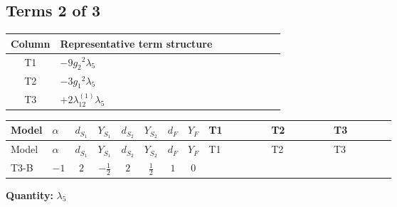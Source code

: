 \documentclass[8pt]{article}
\begin{document}
\begin{landscape}
\subsection*{Terms 2 of 3}
\begin{center}
\begin{tabular}{@{}c >{\raggedright\arraybackslash}p{0.82\linewidth}@{}}
\toprule
Column & Representative term structure \\
\midrule
T1 & \(\displaystyle -9 {g_2}^2 {\lambda_5}\) \\
\midrule
T2 & \(\displaystyle -3 {g_1}^2 {\lambda_5}\) \\
\midrule
T3 & \(\displaystyle +2 {\lambda_{12}^{(1)}} {\lambda_5}\) \\
\midrule
\bottomrule
\end{tabular}
\end{center}
\smallskip
\tiny
\begin{longtable}{@{}llcccccc >{\raggedright\arraybackslash}p{0.21\linewidth} >{\raggedright\arraybackslash}p{0.21\linewidth} >{\raggedright\arraybackslash}p{0.21\linewidth}@{}}
\toprule
Model & $\alpha$ & $d_{S_1}$ & $Y_{S_1}$ & $d_{S_2}$ & $Y_{S_2}$ & $d_F$ & $Y_F$ & T1 & T2 & T3 \\
\midrule
\endfirsthead
\toprule
Model & $\alpha$ & $d_{S_1}$ & $Y_{S_1}$ & $d_{S_2}$ & $Y_{S_2}$ & $d_F$ & $Y_F$ & T1 & T2 & T3 \\
\midrule
\endhead
T3-B & $-1$ & $2$ & $-\frac{1}{2}$ & $2$ & $\frac{1}{2}$ & $1$ & $0$ & \scriptsize\adjustbox{max width=\linewidth}{$\begin{gathered} -9 {g_2}^2 {\lambda_5}\end{gathered}$} & \scriptsize\adjustbox{max width=\linewidth}{$\begin{gathered} -3 {g_1}^2 {\lambda_5}\end{gathered}$} & \scriptsize\adjustbox{max width=\linewidth}{$\begin{gathered} +2 {\lambda_{12}^{(1)}} {\lambda_5}\end{gathered}$} \\
\midrule
\bottomrule
\end{longtable}
\clearpage
\noindent\textbf{Quantity: }$\lambda_5$\par\smallskip

\end{landscape}
\end{document}
